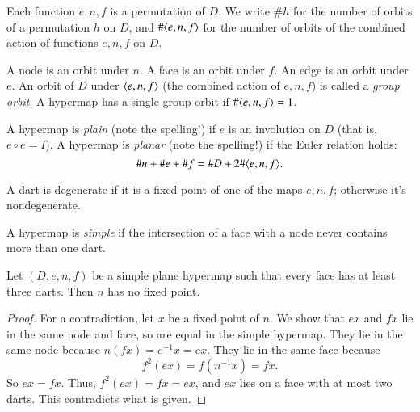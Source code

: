 Each function $e,n,f$ is a permutation of $D$.  
We write $\#h$ for the
number of orbits of a permutation $h$ on $D$, and $\#\langle e,n,f\rangle$
for the number of orbits of the combined action of functions $e,n,f$
on $D$.   

\begin{definition}  A node is an orbit  under
$n$.  A face is an  orbit  under $f$.  An edge
is an orbit under $e$. An orbit of $D$ under $\langle e,n,f\rangle$
(the combined action of $e,n,f$) is called a {\it group orbit}.
A hypermap has a single group orbit
if 
  $\#\langle e,n,f\rangle = 1$. 
\end{definition}

\begin{definition} A hypermap is {\it plain} (note the spelling!) if
$e$ is an involution on $D$ (that is, $e\circ e = I$).  A hypermap
is {\it planar} (note the spelling!) if the Euler relation holds:
    $$\# n + \# e + \# f = \# D + 2 \#\langle e,n,f\rangle.$$
\end{definition}

\begin{definition}[degenerate] A dart is degenerate if it is a
fixed point of one of the maps $e,n,f$; otherwise it's nondegenerate.  
\end{definition}

\begin{definition}[simple] 
A hypermap is {\it simple} if the intersection of a face with
a node never contains more than one dart.
\end{definition}


\begin{lemma} 
Let $(D,e,n,f)$ be a simple plane hypermap such that every face has
at least three darts.
Then $n$ has no fixed point.
\end{lemma}

\begin{proof}  For a contradiction, let $x$ be a fixed point of
$n$. We show that $e x$ and $f x$ lie in the same node and
face, so are equal in the simple hypermap.  
They lie in the same node because
$n(f x) = e^{-1} x = e x$. They lie in the same face because
    $$f^2 (e x) =  f(n^{-1} x) = f x.$$
So $e x = f x$.   Thus, $f^2 (e x) = f x = e x$, and $e x$ lies on a
face with at most two darts.  This contradicts what is given.
\end{proof}

